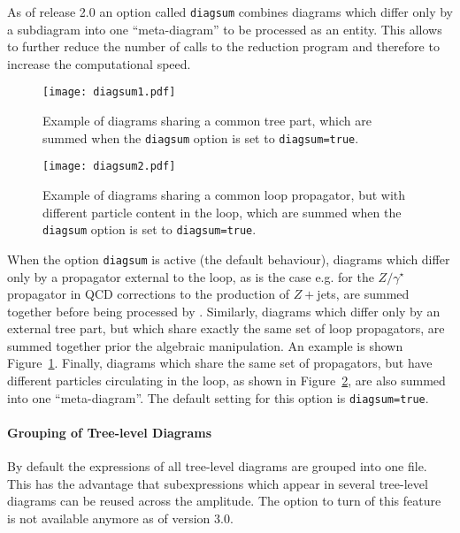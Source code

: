 As of release 2.0 an option called \texttt{diagsum} combines diagrams
which differ only by a subdiagram into one ``meta-diagram'' to be
processed as an entity. This allows to further reduce the number of
calls to the reduction program and therefore to increase the
computational speed. 

\begin{figure}[htb]
\centering
\texttt{[image: diagsum1.pdf]}
\caption{Example of diagrams sharing a common tree part, which are 
summed when the \texttt{diagsum} option is set to \texttt{diagsum=true}.}
\label{fig:diagsum_tree}
\end{figure} 

\begin{figure}[htb]
\centering
\texttt{[image: diagsum2.pdf]}
\caption{Example of diagrams sharing a common loop propagator, 
but with different particle content in the loop, which are summed when
the \texttt{diagsum} option is set to \texttt{diagsum=true}.}
\label{fig:diagsum_particle}
\end{figure} 


When the option \texttt{diagsum} is active (the default behaviour), diagrams which differ only by
a propagator external to the loop, as is the case e.g. for the
$Z/\gamma^\star$ propagator in QCD corrections to the production of
$Z+$jets, are summed together before being processed
by \form{}. Similarly, diagrams which differ only by an external tree
part, but which share exactly the same set of loop propagators, are
summed together prior the algebraic manipulation. An example is shown
Figure~\ref{fig:diagsum_tree}. Finally, diagrams which share the same
set of propagators, but have different particles circulating in the
loop, as shown in Figure~\ref{fig:diagsum_particle}, are also summed
into one ``meta-diagram''. The default setting for this option is \texttt{diagsum=true}.


\paragraph{Grouping of Tree-level Diagrams}

By default the expressions of all tree-level diagrams are grouped into one
file. This has the advantage that subexpressions which appear in several
tree-level diagrams can be reused across the amplitude. The option to turn of this feature is not available anymore as of version 3.0.

